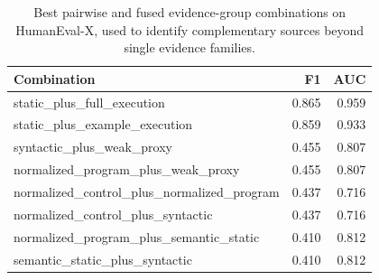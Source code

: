 \begin{table}[!htbp]
\centering
\scriptsize
\begin{tabular}{lrr}
\toprule
Combination & F1 & AUC \\
\midrule
static\_plus\_full\_execution & 0.865 & 0.959 \\
static\_plus\_example\_execution & 0.859 & 0.933 \\
syntactic\_plus\_weak\_proxy & 0.455 & 0.807 \\
normalized\_program\_plus\_weak\_proxy & 0.455 & 0.807 \\
normalized\_control\_plus\_normalized\_program & 0.437 & 0.716 \\
normalized\_control\_plus\_syntactic & 0.437 & 0.716 \\
normalized\_program\_plus\_semantic\_static & 0.410 & 0.812 \\
semantic\_static\_plus\_syntactic & 0.410 & 0.812 \\
\bottomrule
\end{tabular}
\vspace{0.5em}
\caption{Best pairwise and fused evidence-group combinations on HumanEval-X, used to identify complementary sources beyond single evidence families.}
\label{tab:evidence-complementarity}
\end{table}
